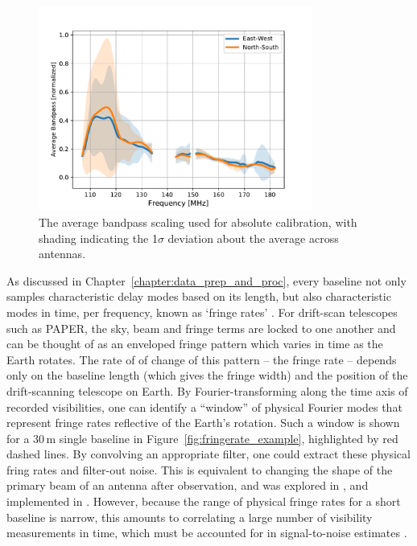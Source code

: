 \begin{figure}
\centering
\includegraphics[width=0.8\textwidth]{chapters/psa128_pol/figures/avg_bandpasses.pdf}
\caption[The average bandpass scaling used for absolute calibration.]{The average bandpass scaling used for absolute calibration, with shading indicating the 1$\sigma$ deviation about the average across antennas.}
\label{fig:psa128_bandpases}
\end{figure}

As discussed in Chapter~\ref{chapter:data_prep_and_proc}, every baseline not only samples characteristic delay modes based on its length, but also characteristic modes in time, per frequency, known as `fringe rates' \citep[if frequency dependence is ignored, they are referred to as ``delay rates''; e.g.][]{ParsonsBacker.09}. For drift-scan telescopes such as PAPER, the sky, beam and fringe terms are locked to one another and can be thought of as an enveloped fringe pattern which varies in time as the Earth rotates. The rate of of change of this pattern -- the fringe rate -- depends only on the baseline length (which gives the fringe width) and the position of the drift-scanning telescope on Earth. By Fourier-transforming along the time axis of recorded visibilities, one can identify a ``window'' of physical Fourier modes that represent fringe rates reflective of the Earth's rotation. Such a window is shown for a 30\,m single baseline in Figure~\ref{fig:fringerate_example}, highlighted by red dashed lines. By convolving an appropriate filter, one could extract these physical fring rates and filter-out noise. This is equivalent to changing the shape of the primary beam of an antenna after observation, and was explored in \cite{Parsons.15}, and implemented in \cite{Ali.15}. However, because the range of physical fringe rates for a short baseline is narrow, this amounts to correlating a large number of visibility measurements in time, which must be accounted for in signal-to-noise estimates \citep[][Cheng et al., (\textit{submitted})]{Ali.15}.

